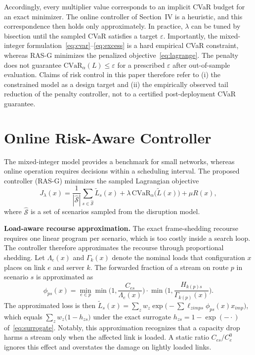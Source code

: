 \documentclass[letterpaper,journal]{IEEEtran}
\begin{document}
Accordingly, every multiplier value corresponds to an implicit CVaR budget for an exact minimizer. The online controller of Section~IV is a heuristic, and this correspondence then holds only approximately. In practice, $\lambda$ can be tuned by bisection until the sampled CVaR satisfies a target $\varepsilon$.
Importantly, the mixed-integer formulation~\eqref{eq:cvar}--\eqref{eq:excess} is a hard empirical CVaR constraint, whereas RAS-G minimizes the penalized objective~\eqref{eq:lagrange}. The penalty does not guarantee $\mathrm{CVaR}_{\alpha}(L)\le\varepsilon$ for a prescribed $\varepsilon$ after out-of-sample evaluation. Claims of risk control in this paper therefore refer to (i) the constrained model as a design target and (ii) the empirically observed tail reduction of the penalty controller, not to a certified post-deployment CVaR guarantee.

\section{Online Risk-Aware Controller}
The mixed-integer model provides a benchmark for small networks, whereas online operation requires decisions within a scheduling interval. The proposed controller (RAS-G) minimizes the sampled Lagrangian objective
\begin{equation}
J_\lambda(x)=\frac{1}{|\hat{\mathcal S}|}\sum_{s\in\hat{\mathcal S}}\tilde L_s(x)+\lambda\,\mathrm{CVaR}_\alpha\big(\tilde L(x)\big)+\mu R(x),
\label{eq:lagrange}
\end{equation}
where $\hat{\mathcal S}$ is a set of scenarios sampled from the disruption model.

\textbf{Load-aware recourse approximation.} The exact frame-shedding recourse requires one linear program per scenario, which is too costly inside a search loop. The controller therefore approximates the recourse through proportional shedding. Let $\Lambda_e(x)$ and $\Gamma_k(x)$ denote the nominal loads that configuration $x$ places on link $e$ and server $k$. The forwarded fraction of a stream on route $p$ in scenario $s$ is approximated as
\begin{equation}
\phi_{ps}(x)=\min_{e\in p}\min\!\Big(1,\frac{C_{es}}{\Lambda_e(x)}\Big)\cdot\min\!\Big(1,\frac{H_{k(p)s}}{\Gamma_{k(p)}(x)}\Big).
\label{eq:phi}
\end{equation}
The approximated loss is then $\tilde L_s(x)=\sum_z w_z\exp\big(-\sum\ell_{zimps}\phi_{ps}(x)x_{imp}\big)$, which equals $\sum_z w_z\big(1-h_{zs}\big)$ under the exact surrogate $h_{zs}=1-\exp(-\cdot)$ of~\eqref{eq:surrogate}. Notably, this approximation recognizes that a capacity drop harms a stream only when the affected link is loaded. A static ratio $C_{es}/C_e^0$ ignores this effect and overstates the damage on lightly loaded links.
\end{document}
